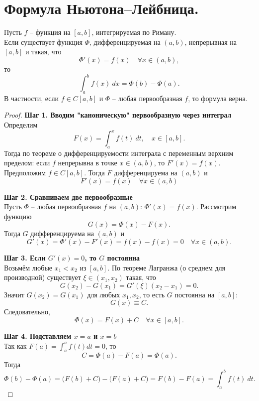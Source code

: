 \documentclass[14pt]{extreport}
\begin{document}
    \chapter{Формула Ньютона–Лейбница.}

    \begin{theorem}
        Пусть $f$ – функция на $[a,b]$, интегрируемая по Риману.\\
        Если существует функция $\Phi$, дифференцируемая на $(a,b)$, непрерывная на $[a,b]$ и такая, что 
        \[
        \Phi'(x) = f(x) \quad \forall x \in (a,b),
        \]
        то
        \[
        \int_a^b f(x)\ dx = \Phi(b) - \Phi(a).
        \]
        В частности, если $f \in C[a,b]$ и $\Phi$ – любая первообразная $f$, то формула верна.
    \end{theorem}

    \begin{proof}
        \textbf{Шаг 1. Вводим "каноническую" первообразную через интеграл}\\
        Определим
        \[
        F(x) = \int_a^x f(t)\ dt, \quad x \in [a,b].
        \]
        Тогда по теореме о дифференцируемости интеграла с переменным верхним пределом: если $f$ непрерывна в точке $x \in (a,b)$, то $F'(x) = f(x)$.\\
        Предположим $f \in C[a,b]$. Тогда $F$ дифференцируема на $(a,b)$ и
        \[
        F'(x) = f(x) \quad \forall x \in (a,b)
        \]

        \textbf{Шаг 2. Сравниваем две первообразные}\\
        Пусть $\Phi$ – любая первообразная $f$ на $(a,b)$: $\Phi'(x) = f(x)$. Рассмотрим функцию 
        \[
        G(x) = \Phi(x) - F(x).
        \]
        Тогда $G$ дифференцируема на $(a,b)$ и 
        \[
        G'(x) = \Phi'(x) - F'(x) = f(x) - f(x) = 0 \quad \forall x \in (a,b).
        \]

        \textbf{Шаг 3. Если $G'(x) = 0$, то $G$ постоянна}\\
        Возьмём любые $x_1 < x_2$ из $[a,b]$. По теореме Лагранжа (о среднем для производной) существует $\xi \in (x_1,x_2)$ такая, что
        \[
        G(x_2) - G(x_1) = G'(\xi)(x_2 - x_1) = 0.
        \]
        Значит $G(x_2) = G(x_1)$ для любых $x_1, x_2$, то есть $G$ постоянна на $[a,b]$:
        \[
        G(x) \equiv C.
        \]
        Следовательно,
        \[
        \Phi(x) = F(x) + C \quad \forall x \in [a,b].
        \]

        \textbf{Шаг 4. Подставляем $x=a$ и $x=b$}\\
        Так как $F(a) = \int_a^a f(t)dt = 0$, то 
        \[
        C = \Phi(a) - F(a) = \Phi(a).
        \]
        Тогда 
        \[
        \Phi(b) - \Phi(a) = \bigl( F(b)+C \bigr) - \bigl( F(a)+C \bigr) = F(b) - F(a) = \int_a^b f(t)\ dt.
        \]
    \end{proof}
\end{document}
